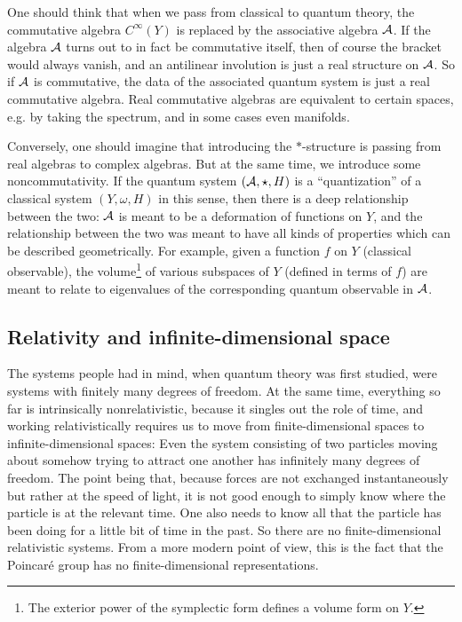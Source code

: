 One should think that when we pass from classical to quantum theory, 
the commutative algebra $C^\infty\left(Y\right)$ is
replaced by the associative algebra $\mathcal{A}$.
If the algebra $\mathcal{A}$ turns out to in fact be commutative itself, then of course the
bracket would always vanish, and an antilinear involution is just a real structure on
$\mathcal{A}$. So if $\mathcal{A}$ is commutative, the data of the associated quantum system is just a
real commutative algebra. Real commutative algebras are equivalent to certain spaces, e.g. by
taking the spectrum, and in some cases even manifolds.

Conversely, one should imagine that introducing the $*$-structure is passing from real
algebras to complex algebras. 
But at the same time, we introduce some noncommutativity.
If the quantum system $\left(\mathcal{A} , \star , H\right)$ is a ``quantization'' of a classical
system $(Y, \omega, H)$ in this sense, then there is a deep relationship between the two:
$\mathcal{A}$ is meant to be a deformation of functions on $Y$, and the relationship between the
two was meant to have all kinds of properties which can be described geometrically.
For example, given a function $f$ on $Y$ (classical observable), the volume\footnote{The
exterior power of the symplectic form defines a volume form on $Y$.}
of various subspaces of $Y$ (defined in terms of $f$) are meant to relate to eigenvalues
of the corresponding quantum observable in $\mathcal{A}$.

\subsection{Relativity and infinite-dimensional space}

The systems people had in mind, when quantum theory was first studied, were
systems with finitely many degrees of freedom. 
At the same time, everything so far is intrinsically nonrelativistic, because it singles
out the role of time, and working relativistically requires us to move from finite-dimensional spaces to
infinite-dimensional spaces:
Even the system consisting of two particles moving about somehow trying to attract one
another has infinitely many degrees of freedom. 
The point being that, because forces are not exchanged instantaneously but rather at the
speed of light, it is not good enough to simply know where the particle is at the relevant
time. One also needs to know all that the particle has been doing for a little bit of time
in the past. 
So there are no finite-dimensional relativistic systems. 
From a more modern point of view, this is the fact that the Poincar\'e group has no
finite-dimensional representations. 

